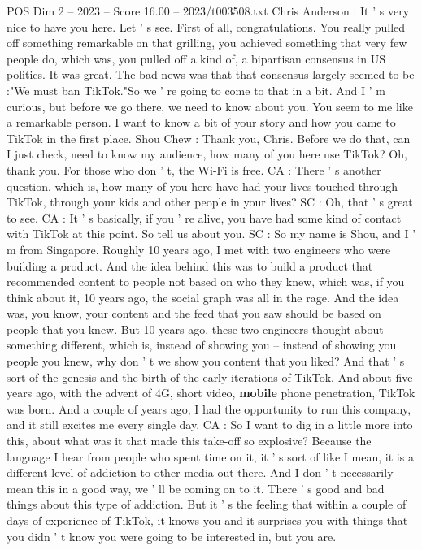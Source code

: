 \begin{textsample}{POS Dim 2 – 2023 – Score 16.00 – 2023/t003508.txt}  \label{ex:f2_pos_050}
Chris Anderson : It ' s very nice to have you here.
Let ' s see.
First of all, congratulations.
You really pulled off something remarkable on that grilling, you achieved something that very few people do, which was, you pulled off a kind of, a bipartisan consensus in US politics.
It was great.
The bad news was that that consensus largely seemed to be :"We must ban TikTok."So we ' re going to come to that in a bit.
And I ' m curious, but before we go there, we need to know about you.
You seem to me like a remarkable person.
I want to know a bit of your story and how you came to TikTok in the first place.
Shou Chew : Thank you, Chris.
Before we do that, can I just check, need to know my audience, how many of you here use TikTok?
Oh, thank you.
For those who don ' t, the Wi-Fi is free.
CA : There ' s another question, which is, how many of you here have had your lives touched through TikTok, through your kids and other people in your lives?
SC : Oh, that ' s great to see.
CA : It ' s basically, if you ' re alive, you have had some kind of contact with TikTok at this point.
So tell us about you.
SC : So my name is Shou, and I ' m from Singapore.
Roughly 10 years ago, I met with two engineers who were building a product.
And the idea behind this was to build a product that recommended content to people not based on who they knew, which was, if you think about it, 10 years ago, the social graph was all in the rage.
And the idea was, you know, your content and the feed that you saw should be based on people that you knew.
But 10 years ago, these two engineers thought about something different, which is, instead of showing you -- instead of showing you people you knew, why don ' t we show you content that you liked?
And that ' s sort of the genesis and the birth of the early iterations of TikTok.
And about five years ago, with the advent of 4G, short video, \textbf{mobile} phone penetration, TikTok was born.
And a couple of years ago, I had the opportunity to run this company, and it still excites me every single day.
CA : So I want to dig in a little more into this, about what was it that made this take-off so explosive?
Because the language I hear from people who spent time on it, it ' s sort of like I mean, it is a different level of addiction to other media out there.
And I don ' t necessarily mean this in a good way, we ' ll be coming on to it.
There ' s good and bad things about this type of addiction.
But it ' s the feeling that within a couple of days of experience of TikTok, it knows you and it surprises you with things that you didn ' t know you were going to be interested in, but you are.

\end{textsample}
